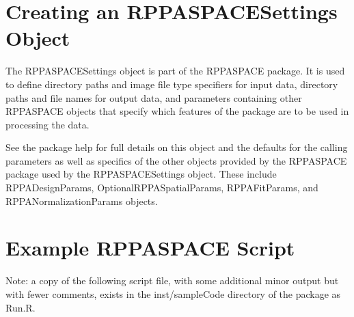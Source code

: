 \documentclass[
]{article}
\begin{document}
\hypertarget{settings}{%
\section{Creating an RPPASPACESettings Object}\label{settings}}

The RPPASPACESettings object is part of the RPPASPACE package. It is
used to define directory paths and image file type specifiers for input
data, directory paths and file names for output data, and parameters
containing other RPPASPACE objects that specify which features of the
package are to be used in processing the data.

See the package help for full details on this object and the defaults
for the calling parameters as well as specifics of the other objects
provided by the RPPASPACE package used by the RPPASPACESettings object.
These include RPPADesignParams, OptionalRPPASpatialParams,
RPPAFitParams, and RPPANormalizationParams objects.

\hypertarget{example_script}{%
\section{Example RPPASPACE Script}\label{example_script}}

Note: a copy of the following script file, with some additional minor
output but with fewer comments, exists in the inst/sampleCode directory
of the package as Run.R.
\end{document}
